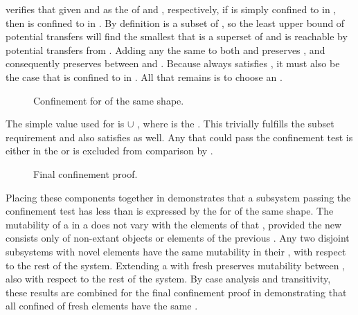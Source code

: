  verifies that given  and  as the \TMpotAcc{} of  and , respectively, if  is simply confined to  in , then  is confined to  in .
By definition  is a subset of , so the least upper bound of potential transfers will find the smallest \TMaccessGraph{}  that is a superset of  and is reachable by potential transfers from .
Adding any the same \TMaccessEdges{} to both  and  preserves \TMagSimpleConfinement{}, and consequently preserves \TMagSimpleConfinement{} between  and .
Because \TMagSimpleConfinement{} always satisfies \TMagConfinement{}, it must also be the case that  is confined to  in .
All that remains is to choose an .

\begin{figure}
  \COQDOCconfinedSubsystemMutable{}
  \caption{Confinement for \TMsubsystems{} of the same shape.\label{fig:confinement:confinedSubsystemMutable}}
\end{figure}

The simple value used for  is  \ensuremath{\cup} , where  is the \TMagFullyAuthorized{}.
This trivially fulfills the subset requirement and also satisfies \TMagSimplyConfined{} as well.
Any \TMaccessEdge{} that could pass the confinement test is either in the \TMagFullyAuthorized{} or is excluded from comparison by \TMagSimplyConfined{}.

\begin{figure}
  \COQDOCconfinement{}
  \caption{Final confinement proof. \label{fig:confinement:confinement}}
\end{figure}

Placing these components together in  demonstrates that a subsystem passing the confinement test has less \TMmutability{} than is expressed by the \TMagFullyAuthorized{} for \TMsubsystems{} of the same shape.
The mutability of a \TMsubsystem{} in a \TMagFullyAuthorized{} does not vary with the elements of that \TMsubsystem{}, provided the new \TMsubsystem{} consists only of non-extant objects or elements of the previous \TMsubsystem{}.
Any two disjoint subsystems with novel elements have the same mutability in their \TMagFullyAuthorized{}, with respect to the rest of the system.
Extending a \TMsubsystem{} with fresh \TMrefs{} preserves mutability between \TMagFullyAuthorized{}, also with respect to the rest of the system.
By case analysis and transitivity, these results are combined for the final confinement proof in  demonstrating that all confined \TMsubsystems{} of fresh elements have the same \TMmutability{}.

